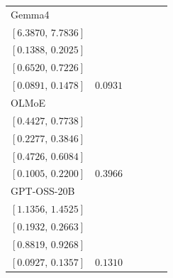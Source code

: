 \begin{tabular*}{\linewidth}{@{\extracolsep{\fill}}lccccc@{}}
Gemma4 & \begin{tabular}[t]{@{}c@{}}\(7.0863\)\\\([6.3870,\,7.7836]\)\end{tabular} & \begin{tabular}[t]{@{}c@{}}\(0.1705\)\\\([0.1388,\,0.2025]\)\end{tabular} & \begin{tabular}[t]{@{}c@{}}\(0.6872\)\\\([0.6520,\,0.7226]\)\end{tabular} & \begin{tabular}[t]{@{}c@{}}\(0.1171\)\\\([0.0891,\,0.1478]\)\end{tabular} & \(0.0931\)\\[2pt]
OLMoE & \begin{tabular}[t]{@{}c@{}}\(0.6056\)\\\([0.4427,\,0.7738]\)\end{tabular} & \begin{tabular}[t]{@{}c@{}}\(0.3059\)\\\([0.2277,\,0.3846]\)\end{tabular} & \begin{tabular}[t]{@{}c@{}}\(0.5356\)\\\([0.4726,\,0.6084]\)\end{tabular} & \begin{tabular}[t]{@{}c@{}}\(0.1577\)\\\([0.1005,\,0.2200]\)\end{tabular} & \(0.3966\)\\[2pt]
GPT-OSS-20B & \begin{tabular}[t]{@{}c@{}}\(1.2942\)\\\([1.1356,\,1.4525]\)\end{tabular} & \begin{tabular}[t]{@{}c@{}}\(0.2293\)\\\([0.1932,\,0.2663]\)\end{tabular} & \begin{tabular}[t]{@{}c@{}}\(0.9040\)\\\([0.8819,\,0.9268]\)\end{tabular} & \begin{tabular}[t]{@{}c@{}}\(0.1134\)\\\([0.0927,\,0.1357]\)\end{tabular} & \(0.1310\)\\[2pt]

\end{tabular*}
